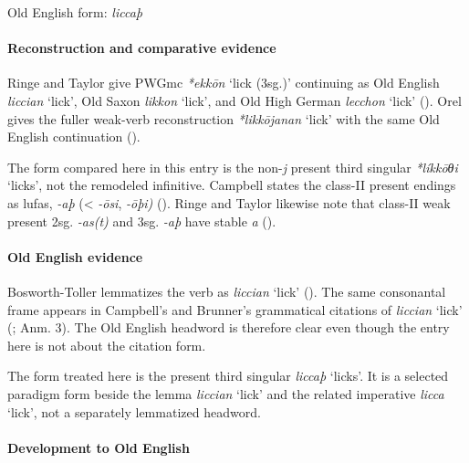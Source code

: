 \documentclass[
  british,
  a4paper,
]{article}
\providecommand{\Recon}[1]{\emph{*#1}}
\begin{document}
Old English form: \emph{liccaþ}

\paragraph{Reconstruction and comparative
evidence}\label{reconstruction-and-comparative-evidence-133}

Ringe and Taylor give PWGmc \Recon{ekkōn} `lick (3sg.)' continuing as
Old English {\emph{liccian}} `lick', Old Saxon {\emph{likkon}} `lick',
and Old High German {\emph{lecchon}} `lick'
(). Orel gives
the fuller weak-verb reconstruction \Recon{likkōjanan} `lick' with the
same Old English continuation ().

The form compared here in this entry is the non-\emph{j} present third
singular \Recon{líkkōθi} `licks', not the remodeled infinitive. Campbell
states the class-II present endings as lufas, \emph{-aþ} (\textless{}
\emph{-ōsi}, \emph{-ōþi)} (). Ringe and Taylor likewise note that class-II weak present
2sg. \emph{-as(t)} and 3sg. \emph{-aþ} have stable \emph{a}
().

\paragraph{Old English evidence}\label{old-english-evidence-135}

Bosworth-Toller lemmatizes the verb as \emph{liccian} `lick'
(). The
same consonantal frame appears in Campbell's and Brunner's grammatical
citations of \emph{liccian} `lick' (;  Anm. 3). The Old English headword is therefore clear even
though the entry here is not about the citation form.

The form treated here is the present third singular {\emph{liccaþ}}
`licks'. It is a selected paradigm form beside the lemma
{\emph{liccian}} `lick' and the related imperative {\emph{licca}}
`lick', not a separately lemmatized headword.

\paragraph{Development to Old
English}\label{development-to-old-english-133}
\end{document}
